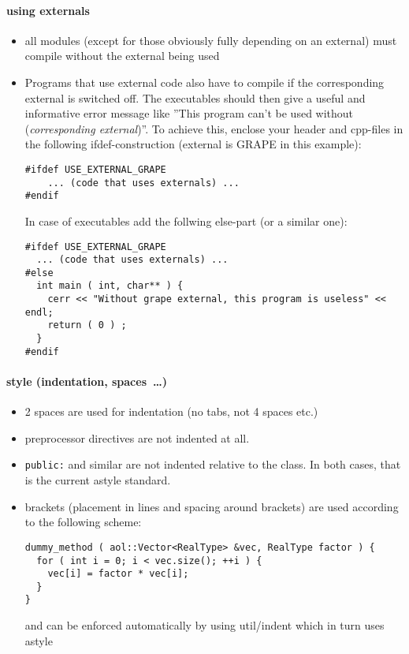 \paragraph{using externals}
\begin{itemize}
\item all modules (except for those obviously fully depending on an
  external) must compile without the external being used
\item Programs that use external code also have to compile if the
  corresponding external is switched off. The executables should then
  give a useful and informative error message like ''This program
  can't be used without (\textit{corresponding external})''. To achieve
  this, enclose your header and cpp-files in the following
  ifdef-construction (external is GRAPE in this example):
\begin{verbatim}
#ifdef USE_EXTERNAL_GRAPE
    ... (code that uses externals) ...
#endif
\end{verbatim}
In case of executables add the follwing else-part (or a similar one):
\begin{verbatim}
#ifdef USE_EXTERNAL_GRAPE
  ... (code that uses externals) ...
#else
  int main ( int, char** ) {
    cerr << "Without grape external, this program is useless" << endl;
    return ( 0 ) ;
  }
#endif
\end{verbatim}
\end{itemize}


\paragraph{style (indentation, spaces~\ldots)}

\begin{itemize}
    \item 2 spaces are used for indentation (no tabs, not 4 spaces etc.)
    \item preprocessor directives are not indented at all.
    \item \texttt{public:} and similar are not indented relative to the class.
          In both cases, that is the current astyle standard.
    \item brackets (placement in lines and spacing around brackets) are used according to the following scheme:
          \begin{verbatim}
dummy_method ( aol::Vector<RealType> &vec, RealType factor ) {
  for ( int i = 0; i < vec.size(); ++i ) {
    vec[i] = factor * vec[i];
  }
}              \end{verbatim}
          and can be enforced automatically by using util/indent which in turn uses astyle
\end{itemize}


